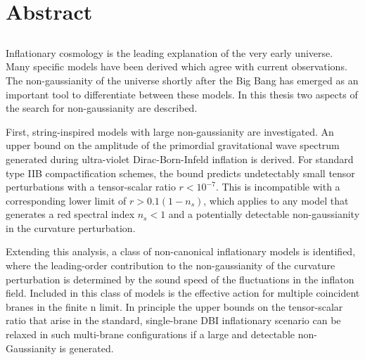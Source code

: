 \renewcommand{\CVSrevision}{\version$Id: abstract.tex,v 1.5 2009/08/15 16:53:35 ith Exp $}
% 
% 
\chapter*{Abstract}
\label{ch:abstract}
\section*{}
\singlespacing
Inflationary cosmology is the leading explanation of the very early universe. 
Many specific models have been derived which agree with current observations.
The non-gaussianity of the universe shortly after the Big Bang has emerged as
an important tool to differentiate between these models. In this thesis
two aspects of the search for non-gaussianity are described.

First, string-inspired models with large non-gaussianity are investigated.
An upper bound on the amplitude of the primordial gravitational wave spectrum
generated during ultra-violet Dirac-Born-Infeld inflation is derived. 
For standard type IIB compactification schemes, the bound predicts
undetectably small tensor perturbations with a tensor-scalar ratio $r <
10^{-7}$. 
This is incompatible with a corresponding lower limit of $r > 0.1
(1-n_s)$, which applies to any model that generates a red spectral index $n_s
<1$ and a potentially detectable non-gaussianity in the curvature perturbation.

Extending this analysis, a class of non-canonical inflationary models is
identified, where the leading-order contribution to the non-gaussianity of the
curvature perturbation is determined by the sound speed of the fluctuations in
the inflaton field. 
Included in this class of models is the effective action for
multiple coincident branes in the finite n limit. 
In principle the upper bounds on the
tensor-scalar ratio that arise in the standard, single-brane DBI inflationary
scenario can be relaxed in such multi-brane configurations if a large and
detectable non-Gaussianity is generated. 

